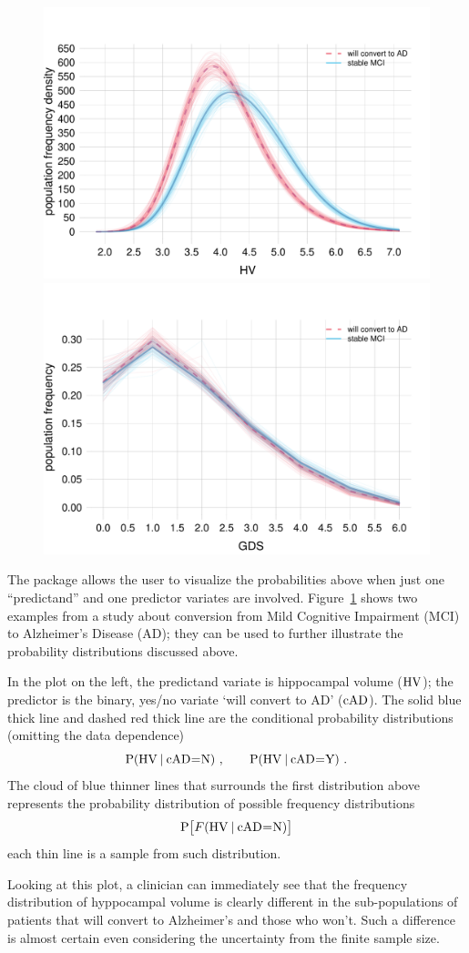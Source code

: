 \documentclass{article}
\begin{document}
\begin{figure}[t]\caption{}\label{fig:distr}
  \centering
  \includegraphics[width=0.49\linewidth]{figures/population_distr_HV.pdf}\hfill%
  \includegraphics[width=0.49\linewidth]{figures/population_distr_GDS.pdf}
\end{figure}
The package allows the user to visualize the probabilities above when just one ``predictand'' and one predictor variates are involved.
Figure~\ref{fig:distr} shows two examples from a study \citep{portamanaetal2023b} about conversion from Mild Cognitive Impairment (MCI) to Alzheimer's Disease (AD); they can be used to further illustrate the probability distributions discussed above.

In the plot on the left, the predictand variate is hippocampal volume ($\mathrm{HV}$); the predictor is the binary, yes/no variate `will convert to AD' ($\mathrm{cAD}$). The solid blue thick line and dashed red thick line are the conditional probability distributions (omitting the data dependence)
\begin{equation*}
  \P( \HV \| \cAD \mo \yn)\ ,\qquad
  \P( \HV \| \cAD \mo \yy) \ .
\end{equation*}
The cloud of blue thinner lines that surrounds the first distribution above  represents the probability distribution of possible frequency distributions
\begin{equation*}
  \P\bigl[ \yF(\HV \| \cAD \mo \yn)\bigr]
\end{equation*}
each thin line is a sample from such distribution.

Looking at this plot, a clinician can immediately see that the frequency distribution of hyppocampal volume is clearly different in the sub-populations of patients that will convert to Alzheimer's and those who won't. Such a difference is almost certain even considering the uncertainty from the finite sample size.
\end{document}

